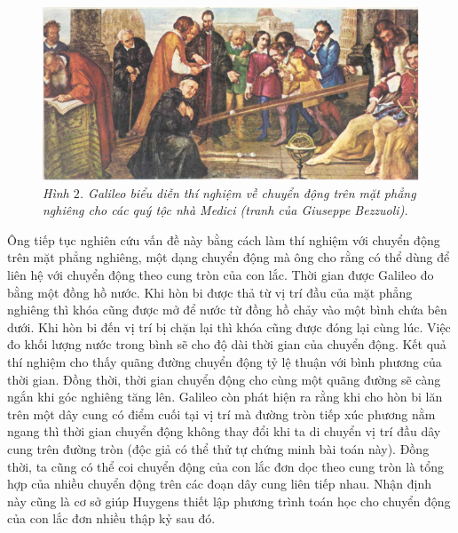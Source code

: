 \begin{multicols}{2}
	\begin{figure}[H]
		\vspace*{-5pt}
		\centering
		\captionsetup{labelformat= empty, justification=centering}
		\includegraphics[width= 1\linewidth]{2}
		\caption{\small\textit{\color{timhieukhoahoc}Hình $2$. Galileo biểu diễn thí nghiệm về chuyển động trên mặt phẳng nghiêng cho các quý tộc nhà Medici (tranh của Giuseppe  Bezzuoli).}}
		\vspace*{-10pt}
	\end{figure}
	Ông tiếp tục nghiên cứu vấn đề này bằng cách làm thí nghiệm với chuyển động trên mặt phẳng nghiêng, một dạng chuyển động mà ông cho rằng có thể dùng để liên hệ với chuyển động theo cung tròn của con lắc. Thời gian được Galileo đo bằng một đồng hồ nước. Khi hòn bi được thả từ vị trí đầu của mặt phẳng nghiêng thì khóa cũng được mở để nước từ đồng hồ chảy vào một bình chứa bên dưới. Khi hòn bi đến vị trí bị chặn lại thì khóa cũng được đóng lại cùng lúc. Việc đo khối lượng nước trong bình sẽ cho độ dài thời gian của chuyển động. Kết quả thí nghiệm cho thấy quãng đường chuyển động tỷ lệ thuận với bình phương của thời gian. Đồng thời, thời gian chuyển động cho cùng một quãng đường sẽ càng ngắn khi góc nghiêng tăng lên.
	\vskip 0.1cm
	Galileo còn phát hiện ra rằng khi cho hòn bi lăn trên một dây cung có điểm cuối tại vị trí mà đường tròn tiếp xúc phương nằm ngang thì thời gian chuyển động không thay đổi khi ta di chuyển vị trí đầu dây cung trên đường tròn (độc giả có thể thử tự chứng minh bài toán này). Đồng thời, ta cũng có thể coi chuyển động của con lắc đơn dọc theo cung tròn là tổng hợp của nhiều chuyển động trên các đoạn dây cung liên tiếp nhau. Nhận định này cũng là cơ sở giúp Huygens thiết lập phương trình toán học cho chuyển động của con lắc đơn nhiều thập kỷ sau đó.
	\begin{figure}[H]
		\vspace*{-5pt}
		\centering
		\captionsetup{labelformat= empty, justification=centering}

\end{figure}
\end{multicols}
